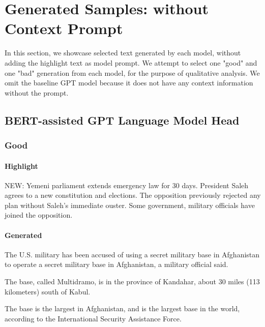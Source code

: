 \documentclass{article}
\begin{document}
\clearpage




\clearpage

\appendix

\section{Generated Samples: without Context Prompt}

In this section, we showcase selected text generated by each model, without adding the highlight text as model prompt. We attempt to select one "good" and one "bad" generation from each model, for the purpose of qualitative analysis. We omit the baseline GPT model because it does not have any context information without the prompt.

\subsection{BERT-assisted GPT Language Model Head}
\label{lm-wo}

\subsubsection{Good}

\paragraph{Highlight} 
NEW: Yemeni parliament extends emergency law for 30 days. President Saleh agrees to a new constitution and elections. The opposition previously rejected any plan without Saleh's immediate ouster. Some government, military officials have joined the opposition.

\paragraph{Generated} 
The U.S. military has been accused of using a secret military base in Afghanistan to operate a secret military base in Afghanistan, a military official said.

The base, called Multidramo, is in the province of Kandahar, about 30 miles (113 kilometers) south of Kabul.

The base is the largest in Afghanistan, and is the largest base in the world, according to the International Security Assistance Force.
\end{document}
